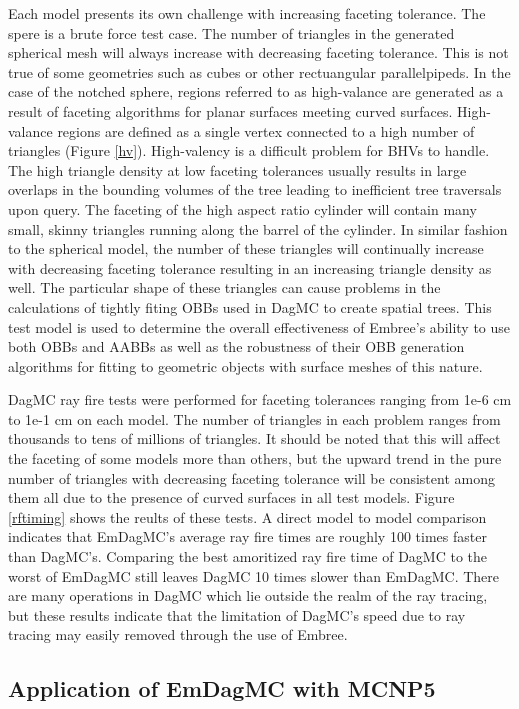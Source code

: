 \documentclass{anstrans}
\begin{document}
Each model presents its own challenge with increasing faceting tolerance. The spere is a brute force test case. The number of triangles in the generated spherical mesh will always increase with decreasing faceting tolerance. This is not true of some geometries such as cubes or other rectuangular parallelpipeds. In the case of the notched sphere, regions referred to as high-valance are generated as a result of faceting algorithms for planar surfaces meeting curved surfaces. High-valance regions are defined as a single vertex connected to a high number of triangles (Figure \ref{hv}). High-valency is a difficult problem for BHVs to handle. The high triangle density at low faceting tolerances usually results in large overlaps in the bounding volumes of the tree leading to inefficient tree traversals upon query. The faceting of the high aspect ratio cylinder will contain many small, skinny triangles running along the barrel of the cylinder. In similar fashion to the spherical model, the number of these triangles will continually increase with decreasing faceting tolerance resulting in an increasing triangle density as well. The particular shape of these triangles can cause problems in the calculations of tightly fiting OBBs used in DagMC to create spatial trees. This test model is used to determine the overall effectiveness of Embree's ability to use both OBBs and AABBs as well as the robustness of their OBB generation algorithms for fitting to geometric objects with surface meshes of this nature.

DagMC ray fire tests were performed for faceting tolerances ranging from 1e-6 cm to 1e-1 cm on each model. The number of triangles in each problem ranges from thousands to tens of millions of triangles. It should be noted that this will affect the faceting of some models more than others, but the upward trend in the pure number of triangles with decreasing faceting tolerance will be consistent among them all due to the presence of curved surfaces in all test models. Figure \ref{rftiming} shows the reults of these tests. A direct model to model comparison indicates that EmDagMC's average ray fire times are roughly 100 times faster than DagMC's. Comparing the best amoritized ray fire time of DagMC to the worst of EmDagMC still leaves DagMC 10 times slower than EmDagMC. There are many operations in DagMC which lie outside the realm of the ray tracing, but these results indicate that the limitation of DagMC's speed due to ray tracing may easily removed through the use of Embree.

\subsection{Application of EmDagMC with MCNP5}
\end{document}
